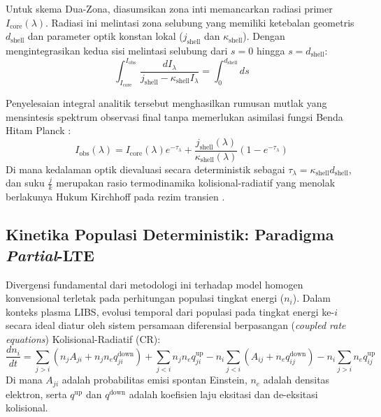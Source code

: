 \documentclass[10pt,leqno]{amsart}
\begin{document}
Untuk skema Dua-Zona, diasumsikan zona inti memancarkan radiasi primer $I_{\text{core}}(\lambda)$. Radiasi ini melintasi zona selubung yang memiliki ketebalan geometris $d_{\text{shell}}$ dan parameter optik konstan lokal ($j_{\text{shell}}$ dan $\kappa_{\text{shell}}$). Dengan mengintegrasikan kedua sisi melintasi selubung dari $s = 0$ hingga $s = d_{\text{shell}}$:
\begin{equation} \label{eq:rte_integral}
\int_{I_{\text{core}}}^{I_{\text{obs}}} \frac{dI_\lambda}{j_{\text{shell}} - \kappa_{\text{shell}} I_\lambda} = \int_{0}^{d_{\text{shell}}} ds
\end{equation}

Penyelesaian integral analitik tersebut menghasilkan rumusan mutlak yang mensintesis spektrum observasi final tanpa memerlukan asimilasi fungsi Benda Hitam Planck \cite{espinosa_analysis_2019}:
\begin{equation} \label{eq:rte_solution}
I_{\text{obs}}(\lambda) = I_{\text{core}}(\lambda) e^{-\tau_\lambda} + \frac{j_{\text{shell}}(\lambda)}{\kappa_{\text{shell}}(\lambda)} \left( 1 - e^{-\tau_\lambda} \right)
\end{equation}
Di mana kedalaman optik dievaluasi secara deterministik sebagai $\tau_\lambda = \kappa_{\text{shell}} d_{\text{shell}}$, dan suku $\frac{j}{k}$ merupakan rasio termodinamika kolisional-radiatif yang menolak berlakunya Hukum Kirchhoff pada rezim transien \cite{rodriguez_mixkiprapcal_2021}.

\subsection{Kinetika Populasi Deterministik: Paradigma \textit{Partial}-LTE}

Divergensi fundamental dari metodologi ini terhadap model homogen konvensional terletak pada perhitungan populasi tingkat energi ($n_i$). Dalam konteks plasma LIBS, evolusi temporal dari populasi pada tingkat energi ke-$i$ secara ideal diatur oleh sistem persamaan diferensial berpasangan (\textit{coupled rate equations}) Kolisional-Radiatif (CR):
\begin{equation} \label{eq:master_kinetic}
\frac{dn_i}{dt} = \sum_{j > i} \left( n_j A_{ji} + n_j n_e q_{ji}^{\text{down}} \right) + \sum_{j < i} n_j n_e q_{ji}^{\text{up}} - n_i \sum_{j < i} \left( A_{ij} + n_e q_{ij}^{\text{down}} \right) - n_i \sum_{j > i} n_e q_{ij}^{\text{up}}
\end{equation}
Di mana $A_{ji}$ adalah probabilitas emisi spontan Einstein, $n_e$ adalah densitas elektron, serta $q^{\text{up}}$ dan $q^{\text{down}}$ adalah koefisien laju eksitasi dan de-eksitasi kolisional.
\end{document}
